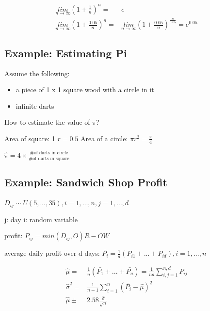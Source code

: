 \documentclass[11pt]{article}
\begin{document}
\begin{equation}
\begin{split}
    \underset{n \to \infty}{lim} (1 + \frac{1}{n})^n = & e\\
    \underset{n \to \infty}{lim} (1 + \frac{0.05}{n})^n = & \underset{n \to \infty}{lim} (1 + \frac{0.05}{n})^{\frac{n}{0.05}} = e^{0.05}
\end{split}
\end{equation}

\subsection{Example: Estimating Pi}
\label{sec:orgd2888ed}

Assume the following:
\begin{itemize}
\item a piece of 1 x 1 square wood with a circle in it
\item infinite darts
\end{itemize}


How to estimate the value of \(\pi\)?

Area of square: 1
\(r = 0.5\)
Area of a circle: \(\pi r^2 = \frac{\pi}{4}\)

\(\hat \pi = 4 \times \frac{\text{\# of darts in circle}}{\text{\# of darts in square}}\)

\subsection{Example: Sandwich Shop Profit}
\label{sec:org220d3f0}

\(D_{ij} \sim U(5, ..., 35), i = 1,...,n, j = 1,...,d\)

j: day
i: random variable

profit: \(P_{ij} = min(D_{ij}, O) R - OW\)

average daily profit over d days: \(\bar{P_i} = \frac{1}{d}(P_{i1} + ... + P_{id}), i = 1, ..., n\)

\begin{equation}
\begin{split}
\hat \mu = & \frac{1}{n}(\bar{P_1} + ... + \bar{P_n}) = \frac{1}{nd} \sum_{i,j = 1}^{n, d} P_{ij}\\
\hat \sigma^2 = & \frac{1}{n - 1} \sum_{i = 1}^{n} (\bar{P_i} - \hat \mu)^2\\
\hat \mu \pm & 2.58 \frac{\hat \sigma}{\sqrt{n}}
\end{split}
\end{equation}
\end{document}
